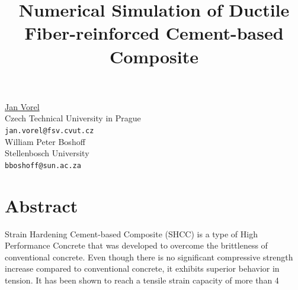 \documentclass[article, A4, 11pt]{llncs}%
\begin{document}
\title{Numerical Simulation of Ductile Fiber-reinforced Cement-based Composite}
 \author{} \institute{}
\maketitle
\begin{center}
{\large \underline{Jan Vorel}}\\
Czech Technical University in Prague\\
{\tt jan.vorel@fsv.cvut.cz}
\\ \vspace{4mm}
{\large William Peter Boshoff}\\
Stellenbosch University\\
{\tt bboshoff@sun.ac.za}
\end{center}

\section*{Abstract}
Strain Hardening Cement-based Composite (SHCC) is a type of High Performance Concrete that was developed to overcome the brittleness of conventional concrete. Even though there is no significant compressive strength increase compared to conventional concrete, it exhibits superior behavior in tension. It has been shown to reach a tensile strain capacity of more than 4%
\end{document}
